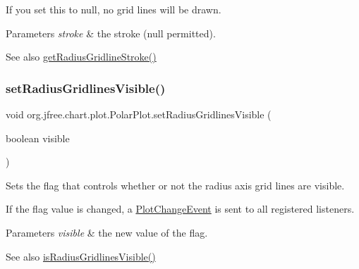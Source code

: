 If you set this to {\ttfamily null}, no grid lines will be drawn.


\begin{DoxyParams}{Parameters}
{\em stroke} & the stroke ({\ttfamily null} permitted).\\
\hline
\end{DoxyParams}
\begin{DoxySeeAlso}{See also}
\mbox{\hyperlink{classorg_1_1jfree_1_1chart_1_1plot_1_1_polar_plot_a1b4ef859b3d90ec47c795f53c66eddb0}{get\+Radius\+Gridline\+Stroke()}} 
\end{DoxySeeAlso}
\mbox{\label{classorg_1_1jfree_1_1chart_1_1plot_1_1_polar_plot_ad0accbd7efb89fbc9cd9db8a5e344e8d}} 
\subsubsection{\texorpdfstring{set\+Radius\+Gridlines\+Visible()}{setRadiusGridlinesVisible()}}
{\footnotesize\ttfamily void org.\+jfree.\+chart.\+plot.\+Polar\+Plot.\+set\+Radius\+Gridlines\+Visible (\begin{DoxyParamCaption}\item[{boolean}]{visible }\end{DoxyParamCaption})}

Sets the flag that controls whether or not the radius axis grid lines are visible. 

If the flag value is changed, a \mbox{\hyperlink{}{Plot\+Change\+Event}} is sent to all registered listeners.


\begin{DoxyParams}{Parameters}
{\em visible} & the new value of the flag.\\
\hline
\end{DoxyParams}
\begin{DoxySeeAlso}{See also}
\mbox{\hyperlink{classorg_1_1jfree_1_1chart_1_1plot_1_1_polar_plot_a671ccfb1c60f6f84f03268404cc12029}{is\+Radius\+Gridlines\+Visible()}} 
\end{DoxySeeAlso}
\mbox{\label{classorg_1_1jfree_1_1chart_1_1plot_1_1_polar_plot_a7db9bf743cb86d1ee47d2b1c4104e5b1}} 
